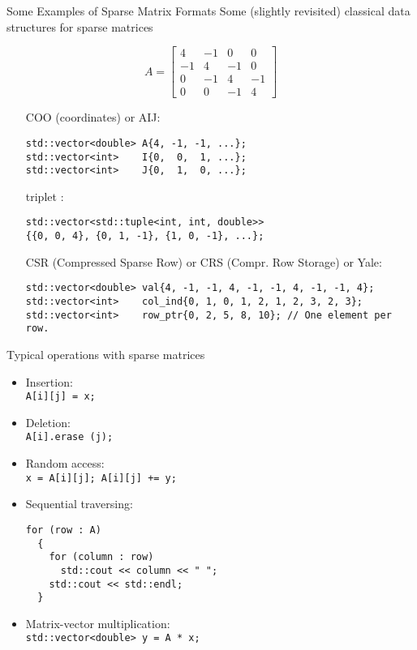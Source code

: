 \documentclass[10pt]{beamer}
\begin{document}
\begin{frame}[fragile]{Some Examples of Sparse Matrix Formats}
Some (slightly revisited) classical data structures for sparse matrices

\begin{equation*}
A = 
\begin{bmatrix}
4  & -1 & 0  & 0\\
-1 &  4 & -1 & 0\\
0  & -1 &  4 & -1\\
0  &  0 &  -1& 4
\end{bmatrix}
\end{equation*}

\begin{itemize}
\item [COO] (coordinates) or AIJ: \tiny
\begin{lstlisting}
std::vector<double> A{4, -1, -1, ...};
std::vector<int>    I{0,  0,  1, ...};
std::vector<int>    J{0,  1,  0, ...};
\end{lstlisting} \normalsize
\item [triplet]: \tiny
\begin{lstlisting}
std::vector<std::tuple<int, int, double>> 
{{0, 0, 4}, {0, 1, -1}, {1, 0, -1}, ...};
\end{lstlisting} \normalsize
\item [CSR] (Compressed Sparse Row) or CRS (Compr. Row Storage) or Yale:\tiny
\begin{lstlisting}
std::vector<double> val{4, -1, -1, 4, -1, -1, 4, -1, -1, 4};
std::vector<int>    col_ind{0, 1, 0, 1, 2, 1, 2, 3, 2, 3};
std::vector<int>    row_ptr{0, 2, 5, 8, 10}; // One element per row.
\end{lstlisting} 
\end{itemize}
\end{frame}

\begin{frame}[fragile]{Typical operations with sparse matrices} 
\begin{itemize}
\item Insertion: \\
\lstinline|A[i][j] = x;|
\item Deletion: \\
\lstinline|A[i].erase (j);|
\item Random access: \\
\lstinline|x = A[i][j]; A[i][j] += y;|
\item Sequential traversing:
\small\begin{lstlisting}
for (row : A)
  {
    for (column : row)
  	  std::cout << column << " ";
    std::cout << std::endl;
  }
\end{lstlisting}\normalsize
\item Matrix-vector multiplication:\\
\lstinline|std::vector<double> y = A * x;|
\end{itemize}
\end{frame}
\end{document}
